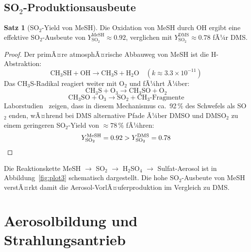 ﻿\documentclass[a4paper,12pt]{article}
\theoremstyle{definition}
\newtheorem{satz}{Satz}
\begin{document}
\subsection{SO\texorpdfstring{$_2$}{2}-Produktionsausbeute}

\begin{satz}[SO$_2$-Yield von MeSH]
  \label{satz:so2yield}
  Die Oxidation von MeSH durch OH ergibt eine effektive SO$_2$-Ausbeute von
  $Y_{\mathrm{SO_2}}^{\mathrm{MeSH}} \approx 0.92$, verglichen mit
  $Y_{\mathrm{SO_2}}^{\mathrm{DMS}} \approx 0.78$ fÃ¼r DMS.
\end{satz}

\begin{proof}
  Der primÃ¤re atmosphÃ¤rische Abbauweg von MeSH ist die H-Abstraktion:
  \[
    \mathrm{CH_3SH} + \mathrm{OH} \rightarrow \mathrm{CH_3S} + \mathrm{H_2O} \quad (k \approx 3.3 \times 10^{-11})
  \]
  Das CH$_3$S-Radikal reagiert weiter mit O$_2$ und fÃ¼hrt Ã¼ber:
  \[
    \mathrm{CH_3S} + \mathrm{O_3} \rightarrow \mathrm{CH_3SO} + \mathrm{O_2}
  \]
  \[
    \mathrm{CH_3SO} + \mathrm{O_3} \rightarrow \mathrm{SO_2} + \text{CH$_3$-Fragmente}
  \]
  Laborstudien~\cite{turnipseed1996, barnes2006} zeigen, dass in diesem Mechanismus ca.~92\,\%
  des Schwefels als SO$_2$ enden, wÃ¤hrend bei DMS alternative Pfade Ã¼ber DMSO und DMSO$_2$ zu
  einem geringeren SO$_2$-Yield von $\approx 78\,\%$ fÃ¼hren:
  \[
    Y_{\mathrm{SO_2}}^{\mathrm{MeSH}} = 0.92 > Y_{\mathrm{SO_2}}^{\mathrm{DMS}} = 0.78 \qedhere
  \]
\end{proof}

Die Reaktionskette MeSH $\rightarrow$ SO$_2$ $\rightarrow$ H$_2$SO$_4$ $\rightarrow$ Sulfat-Aerosol
ist in Abbildung~\ref{fig:plot3} schematisch dargestellt. Die hohe SO$_2$-Ausbeute von MeSH
verstÃ¤rkt damit die Aerosol-VorlÃ¤uferproduktion im Vergleich zu DMS.

\section{Aerosolbildung und Strahlungsantrieb}
\end{document}
